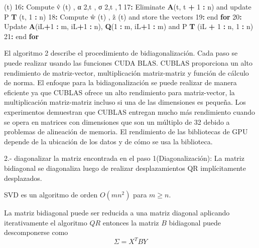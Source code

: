 \documentclass[]{article}
\newenvironment{Shaded}{\begin{snugshade}}{\end{snugshade}}
\newcommand{\KeywordTok}[1]{\textcolor[rgb]{0.13,0.29,0.53}{\textbf{#1}}}
\newcommand{\DecValTok}[1]{\textcolor[rgb]{0.00,0.00,0.81}{#1}}
\newcommand{\StringTok}[1]{\textcolor[rgb]{0.31,0.60,0.02}{#1}}
\newcommand{\ControlFlowTok}[1]{\textcolor[rgb]{0.13,0.29,0.53}{\textbf{#1}}}
\newcommand{\OperatorTok}[1]{\textcolor[rgb]{0.81,0.36,0.00}{\textbf{#1}}}
\newcommand{\NormalTok}[1]{#1}
\begin{document}
\begin{Shaded}
\begin{Highlighting}[]
\NormalTok{(t)}
\DecValTok{16}\OperatorTok{:}
\NormalTok{Compute v̂ (t) , α }\DecValTok{2}\NormalTok{,t , σ }\DecValTok{2}\NormalTok{,t , l̂}
\DecValTok{17}\OperatorTok{:}
\NormalTok{Eliminate }\KeywordTok{A}\NormalTok{(t, t }\OperatorTok{+}\StringTok{ }\DecValTok{1} \OperatorTok{:}\StringTok{ }\NormalTok{n) and update P }\KeywordTok{T}\NormalTok{ (t, }\DecValTok{1} \OperatorTok{:}\StringTok{ }\NormalTok{n)}
\DecValTok{18}\OperatorTok{:}
\NormalTok{Compute ŵ (t) , ẑ (t) and store the vectors}
\DecValTok{19}\OperatorTok{:}
\NormalTok{end }\ControlFlowTok{for}
\DecValTok{20}\OperatorTok{:}
\NormalTok{Update }\KeywordTok{A}\NormalTok{(iL}\OperatorTok{+}\DecValTok{1} \OperatorTok{:}\StringTok{ }\NormalTok{m, iL}\OperatorTok{+}\DecValTok{1} \OperatorTok{:}\StringTok{ }\NormalTok{n), }\KeywordTok{Q}\NormalTok{(}\DecValTok{1} \OperatorTok{:}\StringTok{ }\NormalTok{m, iL}\OperatorTok{+}\DecValTok{1} \OperatorTok{:}\StringTok{ }\NormalTok{m)}
\NormalTok{and P }\KeywordTok{T}\NormalTok{ (iL }\OperatorTok{+}\StringTok{ }\DecValTok{1} \OperatorTok{:}\StringTok{ }\NormalTok{n, }\DecValTok{1} \OperatorTok{:}\StringTok{ }\NormalTok{n)}
\DecValTok{21}\OperatorTok{:}\StringTok{ }\NormalTok{end }\ControlFlowTok{for}
\end{Highlighting}
\end{Shaded}

El algoritmo 2 describe el procedimiento de bidiagonalización. Cada paso
se puede realizar usando las funciones CUDA BLAS. CUBLAS proporciona un
alto rendimiento de matriz-vector, multiplicación matriz-matriz y
función de cálculo de norma. El enfoque para la bidiagonalización se
puede realizar de manera eficiente ya que CUBLAS ofrece un alto
rendimiento para matriz-vector, la multiplicación matriz-matriz incluso
si una de las dimensiones es pequeña. Los experimentos demuestran que
CUBLAS entregan mucho más rendimiento cuando se opera en matrices con
dimensiones que son un múltiplo de 32 debido a problemas de alineación
de memoria. El rendimiento de las bibliotecas de GPU depende de la
ubicación de los datos y de cómo se usa la biblioteca.

2.- diagonalizar la matriz encontrada en el paso 1(Diagonalización): La
matriz bidiagonal se diagonaliza luego de realizar desplazamientos QR
implícitamente desplazados.

SVD es un algoritmo de orden \(O(mn^2)\) para \(m ≥ n\).

La matriz bidiagonal puede ser reducida a una matriz diagonal aplicando
iterativamente el algoritmo \(QR\) entonces la matriz \(B\) bidiagonal
puede descomponerse como \[
\Sigma=X^TBY
\]
\end{document}
